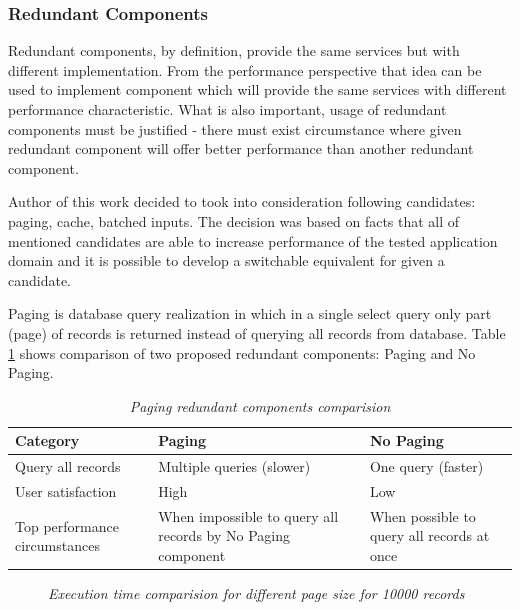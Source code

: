 \documentclass[10pt,a4paper]{article}
\begin{document}
\subsubsection{Redundant Components}
Redundant components, by definition, provide the same services but with different implementation. From the performance perspective that idea can be used to implement component which will provide the same services with different performance characteristic. What is also important, usage of redundant components must be justified - there must exist circumstance where given redundant component will offer better performance than another redundant component. 

Author of this work decided to took into consideration following candidates: paging, cache, batched inputs. The decision was based on facts that all of mentioned candidates are able to increase performance of the  tested application domain and it is possible to develop a switchable equivalent for given a candidate. 

Paging is database query realization in which in a single select query only part (page) of records is returned instead of querying all records from database. Table \ref{pagingcomponents} shows comparison of two proposed redundant components: Paging and No Paging.  
\begin{table}[!htb]
\def\arraystretch{1.5}
\caption{\textit{Paging redundant components comparision}}\label{pagingcomponents}
\begin{tabularx}{\textwidth}{p{3cm}|X|X}
  \textbf{Category} &\textbf{Paging} & \textbf{No Paging} \\
\hline
Query all records & Multiple queries (slower) & One query (faster) \\
User satisfaction & High & Low\\
Top performance circumstances & When impossible to query all records by No Paging component & When possible to query all records at once\\
\end{tabularx}
\end{table}

\begin{figure}[!htb]
\centering
{}
\caption{\textit{Execution time comparision for different page size for 10000 records}} \label{fig:pagesizetime}
\end{figure}
\end{document}
